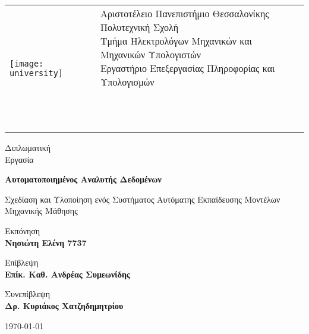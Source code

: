 \begin{titlepage}
	
\begin{tabular}{ll}
	\texttt{[image: university]} &\makecell[l]{ \small Αριστοτέλειο Πανεπιστήμιο Θεσσαλονίκης\\Πολυτεχνική Σχολή\\Τμήμα Ηλεκτρολόγων Μηχανικών και Μηχανικών Υπολογιστών\\Εργαστήριο Επεξεργασίας Πληροφορίας και Υπολογισμών\\
		\\
		\\ \\}
\end{tabular}
\begin{center}	

			
		\vspace{1cm}
		
		\LARGE
		Διπλωματική\\
		Εργασία		
		\vspace{0.3cm}
		
		\Huge
		\textbf{Αυτοματοποιημένος Αναλυτής Δεδομένων}
		
		\vspace{0.3cm}
		\LARGE
		Σχεδίαση και Υλοποίηση ενός Συστήματος Αυτόματης Εκπαίδευσης Μοντέλων Μηχανικής Μάθησης
		
		\vspace{1.5cm}
		
		Εκπόνηση \\
		\textbf{Νησιώτη Ελένη 7737}
		
		\vspace{1.5cm}
		
		Επίβλεψη \\
		\textbf{Επίκ. Καθ. Ανδρέας Συμεωνίδης}
		
		Συνεπίβλεψη \\
		\textbf{Δρ. Κυριάκος Χατζηδημητρίου}
		
		\vspace{1cm}
					
		\today

		
	\end{center}
\end{titlepage}

